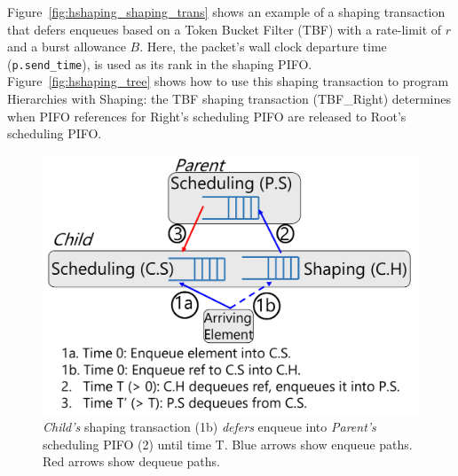 

Figure~\ref{fig:hshaping_shaping_trans} shows an example of a shaping
transaction that defers enqueues based on a Token Bucket Filter (TBF)
with a rate-limit of $r$ and a burst allowance $B$. Here, the packet's
wall clock departure time ({\tt p.send\_time}), is used as its rank in
the shaping PIFO. Figure~\ref{fig:hshaping_tree} shows how to use this
shaping transaction to program Hierarchies with Shaping: the TBF
shaping transaction (TBF\_Right) determines when PIFO references for
Right's scheduling PIFO are released to Root's scheduling PIFO.

\begin{figure}[!t]
  \includegraphics[width=\columnwidth]{pifo_shaping_semantics.pdf}
  \caption{\textit{Child's} shaping transaction (1b) {\em defers} enqueue
  into \textit{Parent's} scheduling PIFO (2) until time T.  Blue arrows
  show enqueue paths. Red arrows show dequeue paths.  }
  \label{fig:shaping_trans}
\end{figure}

